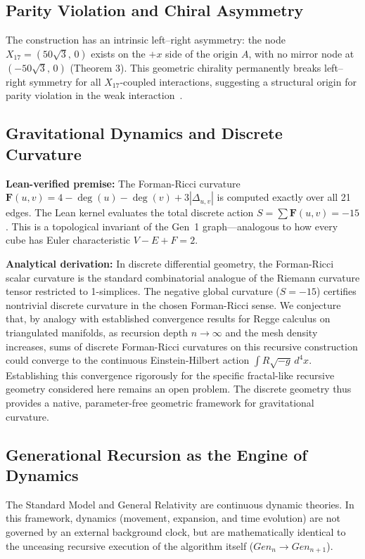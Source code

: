 \documentclass[12pt, a4paper]{article}
\begin{document}
\subsection{Parity Violation and Chiral Asymmetry}
The construction has an intrinsic left--right asymmetry: the node $X_{17} = (50\sqrt{3},\, 0)$ exists on the $+x$ side of the origin $A$, with no mirror node at $(-50\sqrt{3},\, 0)$ (Theorem 3). This geometric chirality permanently breaks left--right symmetry for all $X_{17}$-coupled interactions, suggesting a structural origin for parity violation in the weak interaction~\cite{wuexp}.

\subsection{Gravitational Dynamics and Discrete Curvature}

\noindent\textbf{Lean-verified premise:} The Forman-Ricci curvature $\mathbf{F}(u,v) = 4 - \deg(u) - \deg(v) + 3|\Delta_{u,v}|$ is computed exactly over all 21 edges. The Lean kernel evaluates the total discrete action $S = \sum \mathbf{F}(u,v) = -15$. This is a topological invariant of the Gen~1 graph---analogous to how every cube has Euler characteristic $V - E + F = 2$.

\noindent\textbf{Analytical derivation:} In discrete differential geometry, the Forman-Ricci scalar curvature is the standard combinatorial analogue of the Riemann curvature tensor restricted to 1-simplices. The negative global curvature ($S = -15$) certifies nontrivial discrete curvature in the chosen Forman-Ricci sense. We conjecture that, by analogy with established convergence results for Regge calculus on triangulated manifolds, as recursion depth $n \to \infty$ and the mesh density increases, sums of discrete Forman-Ricci curvatures on this recursive construction could converge to the continuous Einstein-Hilbert action $\int R \sqrt{-g}\, d^4x$. Establishing this convergence rigorously for the specific fractal-like recursive geometry considered here remains an open problem. The discrete geometry thus provides a native, parameter-free geometric framework for gravitational curvature.

\subsection{Generational Recursion as the Engine of Dynamics}

The Standard Model and General Relativity are continuous dynamic theories. In this framework, dynamics (movement, expansion, and time evolution) are not governed by an external background clock, but are mathematically identical to the unceasing recursive execution of the algorithm itself ($Gen_n \to Gen_{n+1}$).
\end{document}
